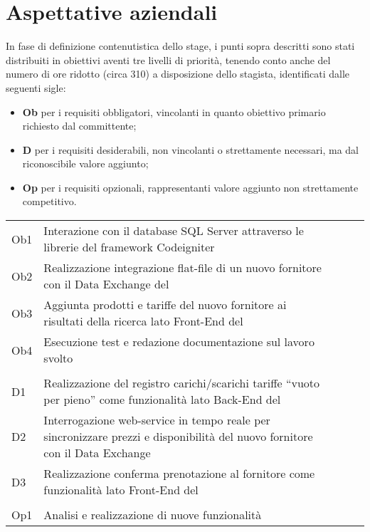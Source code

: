 \section{Aspettative aziendali}
In fase di definizione contenutistica dello stage, i punti sopra descritti sono stati distribuiti in obiettivi aventi tre livelli di priorità, tenendo conto anche del numero di ore ridotto (circa 310) a disposizione dello stagista, identificati dalle seguenti sigle:
\begin{itemize}
	\item \textbf{Ob} per i requisiti obbligatori, vincolanti in quanto obiettivo primario richiesto dal committente;
	\item \textbf{D} per i requisiti desiderabili, non vincolanti o strettamente necessari, ma dal riconoscibile valore aggiunto;
	\item \textbf{Op} per i requisiti opzionali, rappresentanti valore aggiunto non strettamente competitivo.
\end{itemize}

\begin{longtable}{
		@{}
		>{\raggedright}p{.5cm}
		p{10.5cm}
		>{\raggedleft}p{0.2cm}@{}
		>{\raggedright}p{0.2cm}
		p{8.5cm}
		@{}} 
	\hline
	\multicolumn{2}{|c|}{\textbf{Obbligatori}}\\
	\hline
	Ob1 & Interazione con il database SQL Server attraverso le librerie del \gls{framework} Codeigniter\\
	\hline
	Ob2 & Realizzazione integrazione flat-file di un nuovo fornitore con il Data Exchange del \bookingEngine\\
	\hline
	Ob3 & Aggiunta prodotti e tariffe del nuovo fornitore ai risultati della ricerca lato Front-End del \bookingEngine\\
	\hline
	Ob4 & Esecuzione test e redazione documentazione sul lavoro svolto\\
	\hline
	\multicolumn{2}{|c|}{\textbf{Desiderabili}}\\
	\hline
	D1 & Realizzazione del registro carichi/scarichi tariffe “vuoto per pieno” come	funzionalità lato Back-End del \bookingEngine\\
	\hline
	D2 & Interrogazione web-service in tempo reale per sincronizzare prezzi e disponibilità del nuovo fornitore con il Data Exchange\\
	\hline
	D3 & Realizzazione conferma prenotazione al fornitore come funzionalità lato Front-End del \bookingEngine\\
	\hline
	\multicolumn{2}{|c|}{\textbf{Opzionali}}\\
	\hline
	Op1 & Analisi e realizzazione di nuove funzionalità\\
	\hline
\end{longtable}

